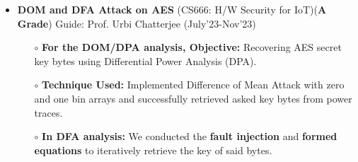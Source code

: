 \documentclass[10.8pt, a4paper]{extarticle}
\begin{document}
\begin{itemize}
  \item \textbf{DOM and DFA Attack on AES} (CS666: H/W Security for IoT)(\textbf{A Grade}) Guide: Prof. Urbi Chatterjee \href{https://github.com/souvikcseiitk/CS666-Hardware-Security-for-Internet-of-Things/tree/main/Assignment%203}{\faGithub{}}  \hfill(July'23-Nov'23)
	\\[-0.6cm]

 \begin{itemize}
\item[$\circ$] \textbf{For the DOM/DPA analysis, Objective:} Recovering AES secret key bytes using Differential Power Analysis (DPA).
\item[$\circ$] \textbf{Technique Used:} Implemented Difference of Mean Attack with zero and one bin arrays and successfully retrieved asked key bytes from power traces.
\item[$\circ$] \textbf{In DFA analysis:} We conducted the \textbf{fault injection} and \textbf{formed equations} to iteratively retrieve the key of said bytes.
\end{itemize}
\end{itemize}
\vspace{2pt}
\end{document}
